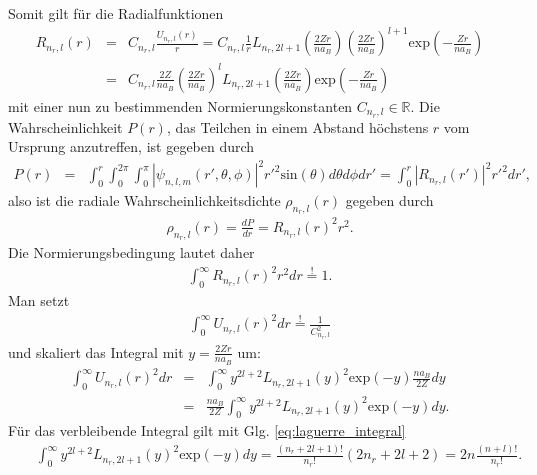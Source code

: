 \documentclass{book}
\newcommand{\hastobe}{\stackrel{!}{=}}
\renewcommand{\exp}{\text{exp}}
\renewcommand{\sin}{\text{sin}}
\begin{document}
%
Somit gilt für die Radialfunktionen
%
\begin{eqnarray}
R_{n_r, l}\left(r\right) & = & C_{n_r, l}\frac{U_{n_r, l}\left(r\right)}{r} = C_{n_r, l}\frac{1}{r}L_{n_r, 2l + 1}^{}\left(\frac{2Zr}{na_B}\right)\left(\frac{2Zr}{na_B}\right)^{l + 1}\exp\left(-\frac{Zr}{na_B}\right)\nonumber\\
& = & C_{n_r, l}\frac{2Z}{na_B}\left(\frac{2Zr}{na_B}\right)^lL_{n_r, 2l + 1}^{}\left(\frac{2Zr}{na_B}\right)\exp\left(-\frac{Zr}{na_B}\right)
\end{eqnarray}
%
mit einer nun zu bestimmenden Normierungskonstanten $C_{n_r, l}\in\mathbb{R}$. Die Wahrscheinlichkeit $P\left(r\right)$, das Teilchen in einem Abstand höchstens $r$ vom Ursprung anzutreffen, ist gegeben durch
%
\begin{eqnarray}
P\left(r\right) & = & \int_{0}^{r}\int_{0}^{2\pi}\int_{0}^{\pi}\left|\psi_{n, l, m}\left(r', \theta, \phi\right)\right|^2r'^2\sin\left(\theta\right)
d\theta d\phi dr' = \int_{0}^{r}\left|R_{n_r, l}\left(r'\right)\right|^2r'^2dr', 
\end{eqnarray}
%
also ist die radiale Wahrscheinlichkeitsdichte $\rho_{n_r, l}\left(r\right)$ gegeben durch
%
\begin{eqnarray}
\rho_{n_r, l}\left(r\right) = \frac{dP}{dr} = R_{n_r, l}\left(r\right)^2r^2.
\end{eqnarray}
%
Die Normierungsbedingung lautet daher
%
\begin{eqnarray}
\int_{0}^\infty R_{n_r, l}\left(r\right)^2r^2dr\hastobe1.
\end{eqnarray}
Man setzt
%
\begin{eqnarray}
\int_{0}^{\infty}U_{n_r, l}\left(r\right)^2dr\hastobe\frac{1}{C_{n_r, l}^2}
\end{eqnarray}
%
und skaliert das Integral mit $y = \frac{2Zr}{na_B}$ um:
%
\begin{eqnarray}
\int_{0}^{\infty}U_{n_r, l}\left(r\right)^2dr & = & \int_{0}^{\infty}y^{2l + 2}L_{n_r, 2l + 1}\left(y\right)^2\exp\left(-y\right)\frac{na_B}{2Z}dy\nonumber\\
& = & \frac{na_B}{2Z}\int_{0}^{\infty}y^{2l + 2}L_{n_r, 2l + 1}\left(y\right)^2\exp\left(-y\right)dy.
\end{eqnarray}
%
Für das verbleibende Integral gilt mit Glg. \eqref{eq:laguerre_integral}
%
\begin{eqnarray}
&&\int_{0}^{\infty}y^{2l + 2}L_{n_r, 2l + 1}\left(y\right)^2\exp\left(-y\right)dy = \frac{\left(n_r + 2l + 1\right)!}{n_r!}\left(2n_r + 2l + 2\right) = 2n\frac{\left(n + l\right)!}{n_r!}.
\end{eqnarray}
\end{document}
